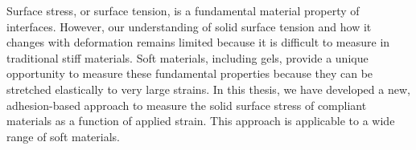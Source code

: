 


%

Surface stress, or surface tension, is a fundamental material property of interfaces. However, our understanding of solid surface tension and how it changes with deformation remains limited because it is difficult to measure in traditional stiff materials. Soft materials, including gels, provide a unique opportunity to measure these fundamental properties because they can be stretched elastically to very large strains. In this thesis, we have developed a new, adhesion-based approach to measure the solid surface stress of compliant materials as a function of applied strain. This approach is applicable to a wide range of soft materials.  

